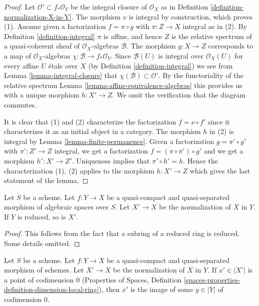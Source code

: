\begin{proof}
Let $\mathcal{O}' \subset f_*\mathcal{O}_Y$ be the integral closure of
$\mathcal{O}_X$ as in Definition \ref{definition-normalization-X-in-Y}.
The morphism $\nu$ is integral by construction, which proves (1).
Assume given a factorization $f = \pi \circ g$ with $\pi : Z \to X$
integral as in (2). By Definition \ref{definition-integral}
$\pi$ is affine, and hence $Z$ is the relative
spectrum of a quasi-coherent sheaf of $\mathcal{O}_X$-algebras $\mathcal{B}$.
The morphism $g : X \to Z$ corresponds to a map of $\mathcal{O}_X$-algebras
$\chi : \mathcal{B} \to f_*\mathcal{O}_Y$. Since $\mathcal{B}(U)$ is
integral over $\mathcal{O}_X(U)$ for every affine $U$ \'etale over $X$
(by Definition \ref{definition-integral})
we see from Lemma \ref{lemma-integral-closure}
that $\chi(\mathcal{B}) \subset \mathcal{O}'$.
By the functoriality of the relative spectrum
Lemma \ref{lemma-affine-equivalence-algebras}
this provides us with a unique morphism
$h : X' \to Z$. We omit the verification that the diagram commutes.

\medskip\noindent
It is clear that (1) and (2) characterize the
factorization $f = \nu \circ f'$ since it characterizes it
as an initial object in a category. The morphism $h$ in (2)
is integral by Lemma \ref{lemma-finite-permanence}.
Given a factorization $g = \pi' \circ g'$ with $\pi' : Z' \to Z$
integral, we get a factorization $f = (\pi \circ \pi') \circ g'$ and
we get a morphism $h' : X' \to Z'$. Uniqueness implies that
$\pi' \circ h' = h$. Hence the characterization (1), (2) applies
to the morphism $h : X' \to Z$ which gives the last statement of the lemma.
\end{proof}

\begin{lemma}
\label{lemma-normalization-in-reduced}
Let $S$ be a scheme. Let $f : Y \to X$ be a quasi-compact and
quasi-separated morphism of algebraic spaces over $S$.
Let $X' \to X$ be the normalization of $X$ in $Y$.
If $Y$ is reduced, so is $X'$.
\end{lemma}

\begin{proof}
This follows from the fact that a subring of a reduced ring is reduced.
Some details omitted.
\end{proof}

\begin{lemma}
\label{lemma-normalization-generic}
Let $S$ be a scheme. Let $f : Y \to X$ be a quasi-compact and quasi-separated
morphism of schemes. Let $X' \to X$ be the normalization of $X$ in $Y$.
If $x' \in |X'|$ is a point of codimension $0$
(Properties of Spaces, Definition
\ref{spaces-properties-definition-dimension-local-ring}), then
$x'$ is the image of some $y \in |Y|$ of codimension $0$.
\end{lemma}

